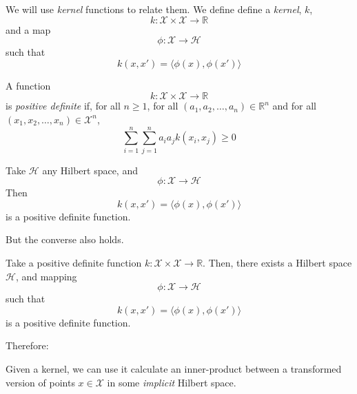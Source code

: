 We will use \emph{kernel} functions to relate them.
\clearpage
We define define a \emph{kernel}, $k$,
\begin{equation*}
k : \mathcal{X} \times \mathcal{X} \rightarrow \mathbb{R}
\end{equation*}
and a map
\begin{equation}
\phi: \mathcal{X} \rightarrow \mathcal{H}
\end{equation}
such that 
\begin{equation*}
k(x, x') = \langle \phi(x), \phi(x') \rangle
\end{equation*}
\clearpage
\begin{defn}
A function 
\begin{equation*}
k:\mathcal{X} \times \mathcal{X}\rightarrow \mathbb{R}
\end{equation*}
 is \emph{positive definite} if,
for all $n \ge 1$,
for all $(a_1, a_2, \ldots, a_n) \in \mathbb{R}^n$ and
for all $(x_1, x_2, \ldots, x_n) \in \mathcal{X}^n$,
\begin{equation*}
\sum_{i=1}^n\sum_{j=1}^n a_i a_j k(x_i, x_j) \ge 0
\end{equation*}
\end{defn}
\clearpage
\begin{fact}
Take $\mathcal{H}$ any Hilbert space, and 
\begin{equation*}
\phi: \mathcal{X} \rightarrow \mathcal{H}
\end{equation*}
Then  
\begin{equation*}
k(x, x') = \langle \phi(x), \phi(x') \rangle
\end{equation*}
is a positive definite function.
\end{fact}
But the converse also holds.
\clearpage
\begin{fact}
Take a positive definite function $k : \mathcal{X} \times \mathcal{X} \rightarrow \mathbb{R}$.
Then, there exists a Hilbert space $\mathcal{H}$, and mapping
\begin{equation*}
\phi: \mathcal{X} \rightarrow \mathcal{H}
\end{equation*}
 such that
 \begin{equation*}
 k(x, x') = \langle \phi(x), \phi(x') \rangle
 \end{equation*}
is a positive definite function.
\end{fact}
\clearpage
Therefore:

Given a kernel, we can use it calculate an inner-product between a transformed version of points $x \in \mathcal{X}$ in some \emph{implicit} Hilbert space.

